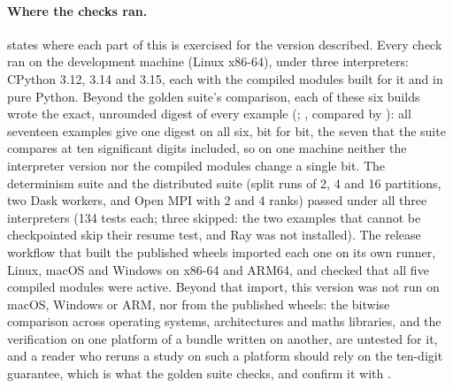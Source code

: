 \paragraph{Where the checks ran.}  states where each part of this is
exercised for the version described. Every check ran on the development machine (Linux
x86-64), under three interpreters: CPython 3.12, 3.14 and 3.15, each with the compiled
modules built for it and in pure Python. Beyond the golden suite's comparison, each of these
six builds wrote the exact, unrounded digest of every example
(; , compared by
): all seventeen examples give one digest on all six,
bit for bit, the seven that the suite compares at ten significant digits included, so on one
machine neither the interpreter version nor the compiled modules change a single bit. The
determinism suite and the distributed suite (split runs of 2, 4 and 16 partitions, two Dask
workers, and Open MPI with 2 and 4 ranks) passed under all three interpreters (134 tests
each; three skipped: the two examples that cannot be checkpointed skip their resume test,
and Ray was not installed). The release workflow that built the published wheels imported
each one on its own runner, Linux, macOS and Windows on x86-64 and ARM64, and checked that
all five compiled modules were active. Beyond that import, this version was not run on
macOS, Windows or ARM, nor from the published wheels: the bitwise comparison across
operating systems, architectures and maths libraries, and the verification on one platform
of a bundle written on another, are untested for it, and a reader who reruns a study on such
a platform should rely on the ten-digit guarantee, which is what the golden suite checks,
and confirm it with .


